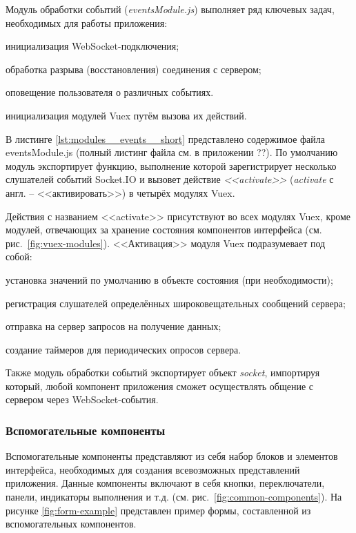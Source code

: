Модуль обработки событий (\emph{eventsModule.js}) выполняет ряд ключевых задач, необходимых для работы приложения:
\begin{dashitemize}
  \item инициализация WebSocket-подключения;
  \item обработка разрыва (восстановления) соединения с сервером;
  \item оповещение пользователя о различных событиях.
  \item инициализация модулей Vuex путём вызова их действий.
\end{dashitemize}

В листинге \ref{lst:modules__events__short} представлено содержимое файла eventsModule.js (полный листинг файла см. в приложении ??). По умолчанию модуль экспортирует функцию, выполнение которой зарегистрирует несколько слушателей событий Socket.IO и вызовет действие \emph{<<activate>>} (\emph{activate} с англ. -- <<активировать>>) в четырёх модулях Vuex.

Действия с названием <<activate>> присутствуют во всех модулях Vuex, кроме модулей, отвечающих за хранение состояния компонентов интерфейса (см. рис.~\ref{fig:vuex-modules}). <<Активация>> модуля Vuex подразумевает под собой:
\begin{dashitemize}
  \item установка значений по умолчанию в объекте состояния (при необходимости);
  \item регистрация слушателей определённых широковещательных сообщений сервера;
  \item отправка на сервер запросов на получение данных;
  \item создание таймеров для периодических опросов сервера.
\end{dashitemize}



Также модуль обработки событий экспортирует объект \emph{socket}, импортируя который, любой компонент приложения сможет осуществлять общение с сервером через WebSocket-события.


\subsubsection{Вспомогательные компоненты}

Вспомогательные компоненты представляют из себя набор блоков и элементов интерфейса, необходимых для создания всевозможных представлений приложения. Данные компоненты включают в себя кнопки, переключатели, панели, индикаторы выполнения и т.д. (см. рис.~\ref{fig:common-components}). На рисунке \ref{fig:form-example} представлен пример формы, составленной из вспомогательных компонентов.


